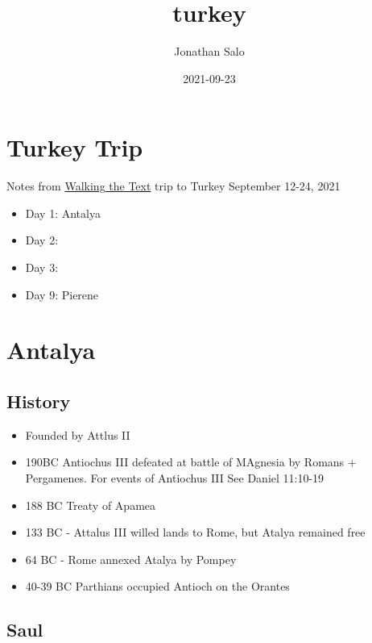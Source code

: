 \documentclass[
]{book}
\title{turkey}
\author{Jonathan Salo}
\date{2021-09-23}
\providecommand{\tightlist}{%
  \setlength{\itemsep}{0pt}\setlength{\parskip}{0pt}}
\begin{document}
\maketitle

{
\setcounter{tocdepth}{1}
\tableofcontents
}
\hypertarget{turkey-trip}{%
\chapter{Turkey Trip}\label{turkey-trip}}

Notes from \href{http://walkingthetestcom}{Walking the Text} trip to Turkey September 12-24, 2021

\begin{itemize}
\item
  Day 1: Antalya
\item
  Day 2:
\item
  Day 3:
\item
  Day 9: Pierene
\end{itemize}

\hypertarget{antalya}{%
\chapter{Antalya}\label{antalya}}

\hypertarget{history}{%
\section{History}\label{history}}

\begin{itemize}
\tightlist
\item
  Founded by Attlus II
\item
  190BC Antiochus III defeated at battle of MAgnesia by Romans + Pergamenes.
  For events of Antiochus III See Daniel 11:10-19
\item
  188 BC Treaty of Apamea
\item
  133 BC - Attalus III willed lands to Rome, but Atalya remained free
\item
  64 BC - Rome annexed Atalya by Pompey
\item
  40-39 BC Parthians occupied Antioch on the Orantes
\end{itemize}

\hypertarget{saul}{%
\section{Saul}\label{saul}}
\end{document}
